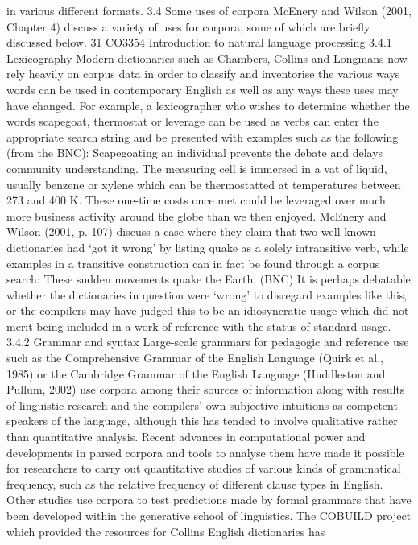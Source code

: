 in various different formats.
3.4 Some uses of corpora
McEnery and Wilson (2001, Chapter 4) discuss a variety of uses for corpora, some of
which are briefly discussed below.
31
CO3354 Introduction to natural language processing
3.4.1 Lexicography
Modern dictionaries such as Chambers, Collins and Longmans now rely heavily on
corpus data in order to classify and inventorise the various ways words can be used
in contemporary English as well as any ways these uses may have changed. For
example, a lexicographer who wishes to determine whether the words scapegoat,
thermostat or leverage can be used as verbs can enter the appropriate search string
and be presented with examples such as the following (from the BNC):
Scapegoating an individual prevents the debate and delays community
understanding.
The measuring cell is immersed in a vat of liquid, usually benzene or xylene which
can be thermostatted at temperatures between 273 and 400 K.
These one-time costs once met could be leveraged over much more business activity
around the globe than we then enjoyed.
McEnery and Wilson (2001, p. 107) discuss a case where they claim that two
well-known dictionaries had ‘got it wrong’ by listing quake as a solely intransitive
verb, while examples in a transitive construction can in fact be found through a
corpus search:
These sudden movements quake the Earth. (BNC)
It is perhaps debatable whether the dictionaries in question were ‘wrong’ to
disregard examples like this, or the compilers may have judged this to be an
idiosyncratic usage which did not merit being included in a work of reference with
the status of standard usage.
3.4.2 Grammar and syntax
Large-scale grammars for pedagogic and reference use such as the Comprehensive
Grammar of the English Language (Quirk et al., 1985) or the Cambridge Grammar of
the English Language (Huddleston and Pullum, 2002) use corpora among their
sources of information along with results of linguistic research and the compilers’
own subjective intuitions as competent speakers of the language, although this has
tended to involve qualitative rather than quantitative analysis. Recent advances in
computational power and developments in parsed corpora and tools to analyse them
have made it possible for researchers to carry out quantitative studies of various
kinds of grammatical frequency, such as the relative frequency of different clause
types in English. Other studies use corpora to test predictions made by formal
grammars that have been developed within the generative school of linguistics. The
COBUILD project which provided the resources for Collins English dictionaries has
